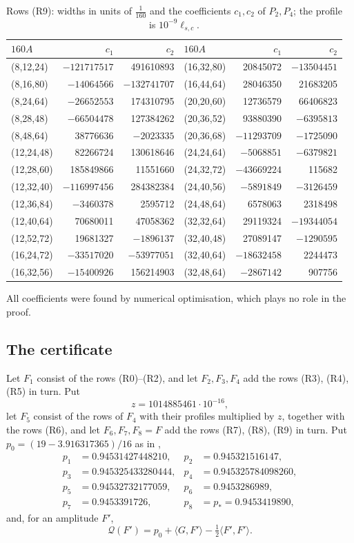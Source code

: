 \documentclass[11pt,colorlinks]{charlie}
\newcommand{\pstar}{p_\ast}
\begin{document}
\begin{table}[ht]\centering\small
\caption{Rows (R9): widths in units of $\frac1{160}$ and the coefficients $c_1,c_2$ of $P_2,P_4$; the profile is $10^{-9}\ell_{s,c}$.}\label{tab:triple}
\begin{tabular}{@{}lrr@{\qquad}lrr@{}}
\toprule
$160A$&$c_1$&$c_2$&$160A$&$c_1$&$c_2$\\\midrule
(8,12,24) & $-121717517$ & 491610893 & (16,32,80) & 20845072 & $-13504451$\\
(8,16,80) & $-14064566$ & $-132741707$ & (16,44,64) & 28046350 & 21683205\\
(8,24,64) & $-26652553$ & 174310795 & (20,20,60) & 12736579 & 66406823\\
(8,28,48) & $-66504478$ & 127384262 & (20,36,52) & 93880390 & $-6395813$\\
(8,48,64) & 38776636 & $-2023335$ & (20,36,68) & $-11293709$ & $-1725090$\\
(12,24,48) & 82266724 & 130618646 & (24,24,64) & $-5068851$ & $-6379821$\\
(12,28,60) & 185849866 & 11551660 & (24,32,72) & $-43669224$ & 115682\\
(12,32,40) & $-116997456$ & 284382384 & (24,40,56) & $-5891849$ & $-3126459$\\
(12,36,84) & $-3460378$ & 2595712 & (24,48,64) & 6578063 & 2318498\\
(12,40,64) & 70680011 & 47058362 & (32,32,64) & 29119324 & $-19344054$\\
(12,52,72) & 19681327 & $-1896137$ & (32,40,48) & 27089147 & $-1290595$\\
(16,24,72) & $-33517020$ & $-53977051$ & (32,40,64) & $-18632458$ & 2244473\\
(16,32,56) & $-15400926$ & 156214903 & (32,48,64) & $-2867142$ & 907756\\
\bottomrule
\end{tabular}
\end{table}

All coefficients were found by numerical optimisation, which plays no role in the proof.

\subsection{The certificate}
Let $F_1$ consist of the rows (R0)--(R2), and let $F_2,F_3,F_4$ add the rows (R3), (R4), (R5) in turn. Put
\[
 z=1014885461\cdot10^{-16},
\]
let $F_5$ consist of the rows of $F_4$ with their profiles multiplied by $z$, together with the rows (R6), and let $F_6,F_7,F_8=F$ add the rows (R7), (R8), (R9) in turn. Put $p_0=(19-3.916317365)/16$ as in ,
\begin{align*}
 p_1&=0.94531427448210, & p_2&=0.945321516147,\\
 p_3&=0.945325433280444, & p_4&=0.945325784098260,\\
 p_5&=0.94532732177059, & p_6&=0.9453286989,\\
 p_7&=0.9453391726, & p_8&=\pstar=0.9453419890,
\end{align*}
and, for an amplitude $F'$,
\[
 \mathcal Q(F')=p_0+\langle G,F'\rangle-\tfrac12\langle F',F'\rangle .
\]
\end{document}
